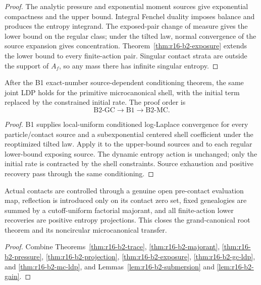 \begin{proof}
The analytic pressure and exponential moment sources give exponential
compactness and the upper bound.  Integral Fenchel duality imposes balance and
produces the entropy integrand.  The exposed-pair change of measure gives the
lower bound on the regular class; under the tilted law, normal convergence of
the source expansion gives concentration.  Theorem~\ref{thm:r16-b2-exposure}
extends the lower bound to every finite-action pair.  Singular contact strata
are outside the support of \(A_f\), so any mass there has infinite singular
entropy.
\end{proof}

\begin{theorem}
\label{thm:r16-b2-mc-ldp}
After the B1 exact-number source-dependent conditioning theorem, the same
joint LDP holds for the primitive microcanonical shell, with the initial term
replaced by the constrained initial rate.  The proof order is
\[
 \text{B2-GC}\longrightarrow\text{B1}\longrightarrow\text{B2-MC}.
\]
\end{theorem}

\begin{proof}
B1 supplies local-uniform conditioned log-Laplace convergence for every
particle/contact source and a subexponential centered shell coefficient under
the reoptimized tilted law.  Apply it to the upper-bound sources and to each
regular lower-bound exposing source.  The dynamic entropy action is unchanged;
only the initial rate is contracted by the shell constraints.  Source
exhaustion and positive recovery pass through the same conditioning.
\end{proof}

\begin{theorem}
\label{thm:r16-b2-main}
Actual contacts are controlled through a genuine open pre-contact evaluation
map, reflection is introduced only on its contact zero set, fixed genealogies
are summed by a cutoff-uniform factorial majorant, and all finite-action lower
recoveries are positive entropy projections.  This closes the grand-canonical
root theorem and its noncircular microcanonical transfer.
\end{theorem}

\begin{proof}
Combine Theorems~\ref{thm:r16-b2-trace},
\ref{thm:r16-b2-majorant}, \ref{thm:r16-b2-pressure},
\ref{thm:r16-b2-projection}, \ref{thm:r16-b2-exposure},
\ref{thm:r16-b2-gc-ldp}, and \ref{thm:r16-b2-mc-ldp}, and
Lemmas~\ref{lem:r16-b2-submersion} and \ref{lem:r16-b2-gain}.
\end{proof}
